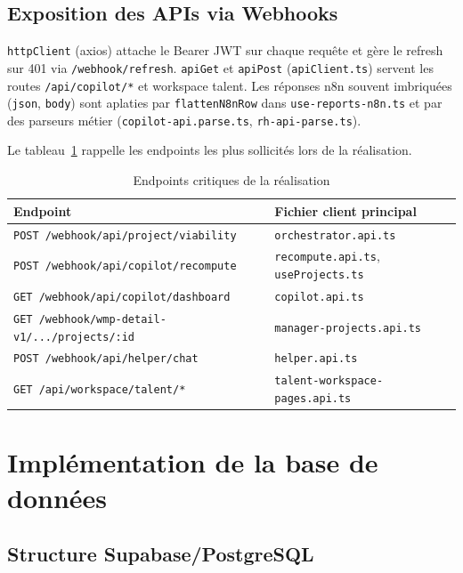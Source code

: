 \subsection{Exposition des APIs via Webhooks}

\texttt{httpClient} (axios) attache le Bearer JWT sur chaque requête et gère le refresh sur 401 via \texttt{/webhook/refresh}. \texttt{apiGet} et \texttt{apiPost} (\texttt{apiClient.ts}) servent les routes \texttt{/api/copilot/*} et workspace talent. Les réponses n8n souvent imbriquées (\texttt{json}, \texttt{body}) sont aplaties par \texttt{flattenN8nRow} dans \texttt{use-reports-n8n.ts} et par des parseurs métier (\texttt{copilot-api.parse.ts}, \texttt{rh-api-parse.ts}).

Le tableau~\ref{tab:impl-api-ch5} rappelle les endpoints les plus sollicités lors de la réalisation.

\begin{table}[htbp]
\centering
\caption{Endpoints critiques de la réalisation}
\label{tab:impl-api-ch5}
\begin{tabular}{@{}ll@{}}
\toprule
\textbf{Endpoint} & \textbf{Fichier client principal} \\
\midrule
\texttt{POST /webhook/api/project/viability} & \texttt{orchestrator.api.ts} \\
\texttt{POST /webhook/api/copilot/recompute} & \texttt{recompute.api.ts}, \texttt{useProjects.ts} \\
\texttt{GET /webhook/api/copilot/dashboard} & \texttt{copilot.api.ts} \\
\texttt{GET /webhook/wmp-detail-v1/.../projects/:id} & \texttt{manager-projects.api.ts} \\
\texttt{POST /webhook/api/helper/chat} & \texttt{helper.api.ts} \\
\texttt{GET /api/workspace/talent/*} & \texttt{talent-workspace-pages.api.ts} \\
\bottomrule
\end{tabular}
\end{table}

\section{Implémentation de la base de données}

\subsection{Structure Supabase/PostgreSQL}

